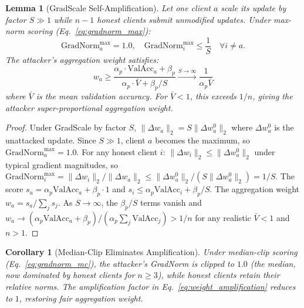 \documentclass[journal]{IEEEtran}
\newtheorem{lemma}[theorem]{Lemma}
\newtheorem{corollary}[theorem]{Corollary}
\theoremstyle{definition}
\theoremstyle{remark}
\begin{document}
\begin{lemma}[GradScale Self-Amplification]
\label{lem:amplification}
Let one client $a$ scale its update by factor $S \gg 1$ while $n-1$
honest clients submit unmodified updates.
Under max-norm scoring (Eq.~\ref{eq:gradnorm_max}):
\begin{equation}
  \mathrm{GradNorm}_a^{\mathrm{max}} = 1.0, \quad
  \mathrm{GradNorm}_i^{\mathrm{max}} \leq \frac{1}{S}
  \quad \forall i \neq a.
  \label{eq:amplification}
\end{equation}
The attacker's aggregation weight satisfies:
\begin{equation}
  w_a \geq \frac{\alpha_p \cdot \mathrm{ValAcc}_a + \beta_p}
               {\alpha_p \cdot \bar{V} + \beta_p/S}
  \xrightarrow{S \to \infty} \frac{1}{\alpha_p \bar{V}}
  \label{eq:weight_amplification}
\end{equation}
where $\bar{V}$ is the mean validation accuracy.
For $\bar{V} < 1$, this exceeds $1/n$, giving the attacker
super-proportional aggregation weight.
\end{lemma}

\begin{proof}
Under GradScale by factor $S$, $\|\Delta w_a\|_2 = S \|\Delta w_a^0\|_2$
where $\Delta w_a^0$ is the unattacked update.
Since $S \gg 1$, client $a$ becomes the maximum, so
$\mathrm{GradNorm}_a^{\mathrm{max}} = 1.0$.
For any honest client $i$: $\|\Delta w_i\|_2 \leq \|\Delta w_a^0\|_2$
under typical gradient magnitudes, so
$\mathrm{GradNorm}_i^{\mathrm{max}} = \|\Delta w_i\|_2 / \|\Delta w_a\|_2
\leq \|\Delta w_a^0\|_2 / (S\|\Delta w_a^0\|_2) = 1/S$.
The score $s_a = \alpha_p \mathrm{ValAcc}_a + \beta_p \cdot 1$
and $s_i \leq \alpha_p \mathrm{ValAcc}_i + \beta_p/S$.
The aggregation weight $w_a = s_a / \sum_j s_j$.
As $S \to \infty$, the $\beta_p/S$ terms vanish and
$w_a \to (\alpha_p \mathrm{ValAcc}_a + \beta_p) /
(\alpha_p \sum_j \mathrm{ValAcc}_j) > 1/n$
for any realistic $\bar{V} < 1$ and $n > 1$.
\end{proof}

\begin{corollary}[Median-Clip Eliminates Amplification]
\label{cor:mc_fix}
Under median-clip scoring (Eq.~\ref{eq:gradnorm_mc}), the attacker's
GradNorm is clipped to $1.0$ (the median, now dominated by honest
clients for $n \geq 3$), while honest clients retain their relative
norms. The amplification factor in Eq.~\ref{eq:weight_amplification}
reduces to $1$, restoring fair aggregation weight.
\end{corollary}
\end{document}
